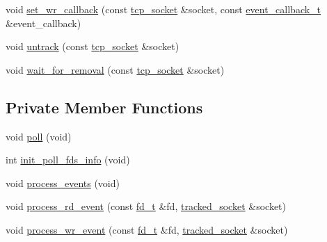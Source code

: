 \begin{DoxyCompactItemize}
\item 
void \hyperlink{classtacopie_1_1io__service_a7c4f56c7790c7ba52b09837a42aaffb1}{set\+\_\+wr\+\_\+callback} (const \hyperlink{classtacopie_1_1tcp__socket}{tcp\+\_\+socket} \&socket, const \hyperlink{classtacopie_1_1io__service_abb66850c32d9c724f4418d77bd04bcfd}{event\+\_\+callback\+\_\+t} \&event\+\_\+callback)
\item 
void \hyperlink{classtacopie_1_1io__service_a9a7672f0894a0fc1a3e6c593ca6df22c}{untrack} (const \hyperlink{classtacopie_1_1tcp__socket}{tcp\+\_\+socket} \&socket)
\item 
void \hyperlink{classtacopie_1_1io__service_aa57db619baeaa6db0aeb22e67b895cd7}{wait\+\_\+for\+\_\+removal} (const \hyperlink{classtacopie_1_1tcp__socket}{tcp\+\_\+socket} \&socket)
\end{DoxyCompactItemize}
\subsection*{Private Member Functions}
\begin{DoxyCompactItemize}
\item 
void \hyperlink{classtacopie_1_1io__service_a03813e0e91d70d367f9fb0ff0d86d3dd}{poll} (void)
\item 
int \hyperlink{classtacopie_1_1io__service_a7311358423dddd6a9d17c61b2c365ff8}{init\+\_\+poll\+\_\+fds\+\_\+info} (void)
\item 
void \hyperlink{classtacopie_1_1io__service_a90a2ab7b6bbaf10bbc0607ce371cc806}{process\+\_\+events} (void)
\item 
void \hyperlink{classtacopie_1_1io__service_a65c3ef9fa1473708b81b05029f6861f9}{process\+\_\+rd\+\_\+event} (const \hyperlink{namespacetacopie_acce7ad26b2d30156b1e6fa353f727026}{fd\+\_\+t} \&fd, \hyperlink{structtacopie_1_1io__service_1_1tracked__socket}{tracked\+\_\+socket} \&socket)
\item 
void \hyperlink{classtacopie_1_1io__service_a55e334cdf75187b9296c03447e32a63f}{process\+\_\+wr\+\_\+event} (const \hyperlink{namespacetacopie_acce7ad26b2d30156b1e6fa353f727026}{fd\+\_\+t} \&fd, \hyperlink{structtacopie_1_1io__service_1_1tracked__socket}{tracked\+\_\+socket} \&socket)
\end{DoxyCompactItemize}
